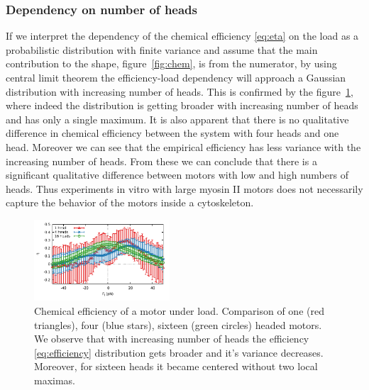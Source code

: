 \documentclass[aps,pre,twocolumn,showpacs,showkeys,superscriptaddress,floatfix]{revtex4-1}
\begin{document}
\subsubsection{Dependency on number of heads}
If we interpret the dependency of the chemical efficiency \eqref{eq:eta} on the load as a probabilistic distribution with finite variance and assume that the main contribution to the shape, figure~\ref{fig:chem}, is from the numerator, 
by using central limit theorem the efficiency-load dependency will approach a Gaussian distribution with increasing number of heads. 
This is confirmed by the figure~\ref{fig:chem_eff_1head}, where indeed the distribution is getting broader with increasing number of heads and has only a single maximum.
It is also apparent that there is no qualitative difference in chemical efficiency between the system with four heads and one head.
Moreover we can see that the empirical efficiency has less variance with the increasing number of heads. 
From these we can conclude that there is a significant qualitative difference between motors with low and high numbers of heads. 
Thus experiments in vitro with large myosin II motors \cite{} does not necessarily capture the behavior of the motors inside a cytoskeleton. %
\begin{figure}[t]
\centering
\includegraphics[width=0.45\textwidth,height=!]{chemical_cycle_1head}
\caption{
\label{fig:chem_eff_1head}
Chemical efficiency of a motor under load. 
Comparison of one (red triangles), four (blue stars), sixteen (green circles) headed motors.
We observe that with increasing number of heads the efficiency \eqref{eq:efficiency} distribution 
gets broader and it's variance decreases.
Moreover, for sixteen heads it became centered without two local maximas. 
}
\end{figure}
\end{document}
